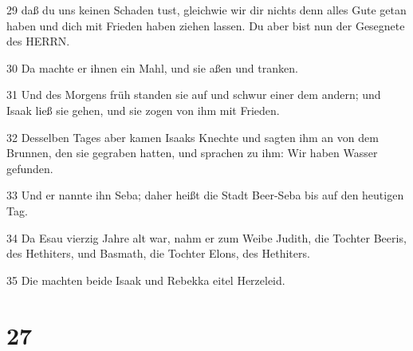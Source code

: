 \par 29 daß du uns keinen Schaden tust, gleichwie wir dir nichts denn alles Gute getan haben und dich mit Frieden haben ziehen lassen. Du aber bist nun der Gesegnete des HERRN.
\par 30 Da machte er ihnen ein Mahl, und sie aßen und tranken.
\par 31 Und des Morgens früh standen sie auf und schwur einer dem andern; und Isaak ließ sie gehen, und sie zogen von ihm mit Frieden.
\par 32 Desselben Tages aber kamen Isaaks Knechte und sagten ihm an von dem Brunnen, den sie gegraben hatten, und sprachen zu ihm: Wir haben Wasser gefunden.
\par 33 Und er nannte ihn Seba; daher heißt die Stadt Beer-Seba bis auf den heutigen Tag.
\par 34 Da Esau vierzig Jahre alt war, nahm er zum Weibe Judith, die Tochter Beeris, des Hethiters, und Basmath, die Tochter Elons, des Hethiters.
\par 35 Die machten beide Isaak und Rebekka eitel Herzeleid.

\chapter{27}

